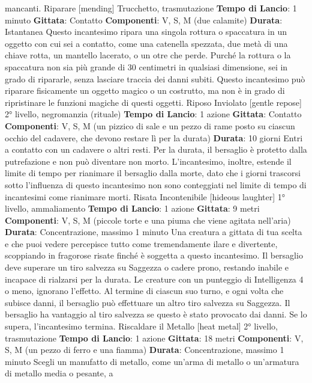 \begin{multicols}{2}
mancanti.
Riparare
[mending]
Trucchetto, trasmutazione
\textbf{Tempo di Lancio}: 1 minuto
\textbf{Gittata}: Contatto
\textbf{Componenti}: V, S, M (due calamite)
\textbf{Durata}: Istantanea
Questo incantesimo ripara una singola rottura o
spaccatura in un oggetto con cui sei a contatto, come
una catenella spezzata, due metà di una chiave rotta,
un mantello lacerato, o un otre che perde. Purché la
rottura o la spaccatura non sia più grande di 30
centimetri in qualsiasi dimensione, sei in grado di
ripararle, senza lasciare traccia dei danni subiti.
Questo incantesimo può riparare fisicamente un
oggetto magico o un costrutto, ma non è in grado di
ripristinare le funzioni magiche di questi oggetti.
Riposo Inviolato
[gentle repose]
2° livello, negromanzia (rituale)
\textbf{Tempo di Lancio}: 1 azione
\textbf{Gittata}: Contatto
\textbf{Componenti}: V, S, M (un pizzico di sale e un pezzo di
rame posto su ciascun occhio del cadavere, che
devono restare lì per la durata)
\textbf{Durata}: 10 giorni
Entri a contatto con un cadavere o altri resti. Per la
durata, il bersaglio è protetto dalla putrefazione e non
può diventare non morto.
L’incantesimo, inoltre, estende il limite di tempo per
rianimare il bersaglio dalla morte, dato che i giorni
trascorsi sotto l’influenza di questo incantesimo non 
sono conteggiati nel limite di tempo di incantesimi come
rianimare morti.
Risata Incontenibile
[hideous laughter]
1° livello, ammaliamento
\textbf{Tempo di Lancio}: 1 azione
\textbf{Gittata}: 9 metri
\textbf{Componenti}: V, S, M (piccole torte e una piuma che
viene agitata nell’aria)
\textbf{Durata}: Concentrazione, massimo 1 minuto
Una creatura a gittata di tua scelta e che puoi vedere
percepisce tutto come tremendamente ilare e
divertente, scoppiando in fragorose risate finché è
soggetta a questo incantesimo. Il bersaglio deve
superare un tiro salvezza su Saggezza o cadere prono,
restando inabile e incapace di rialzarsi per la durata. Le
creature con un punteggio di Intelligenza 4 o meno,
ignorano l’effetto.
Al termine di ciascun suo turno, e ogni volta che
subisce danni, il bersaglio può effettuare un altro tiro
salvezza su Saggezza. Il bersaglio ha vantaggio al tiro
salvezza se questo è stato provocato dai danni. Se lo
supera, l’incantesimo termina.
Riscaldare il Metallo
[heat metal]
2° livello, trasmutazione
\textbf{Tempo di Lancio}: 1 azione
\textbf{Gittata}: 18 metri
\textbf{Componenti}: V, S, M (un pezzo di ferro e una fiamma)
\textbf{Durata}: Concentrazione, massimo 1 minuto
Scegli un manufatto di metallo, come un’arma di
metallo o un’armatura di metallo media o pesante, a

\end{multicols}
